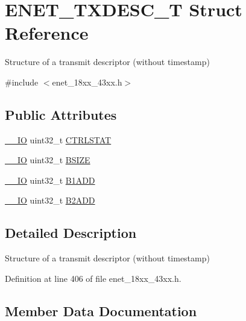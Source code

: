 \hypertarget{struct_e_n_e_t___t_x_d_e_s_c___t}{}\section{E\+N\+E\+T\+\_\+\+T\+X\+D\+E\+S\+C\+\_\+T Struct Reference}
\label{struct_e_n_e_t___t_x_d_e_s_c___t}


Structure of a transmit descriptor (without timestamp)  




{\ttfamily \#include $<$enet\+\_\+18xx\+\_\+43xx.\+h$>$}

\subsection*{Public Attributes}
\begin{DoxyCompactItemize}
\item 
\hyperlink{core__sc300_8h_aec43007d9998a0a0e01faede4133d6be}{\+\_\+\+\_\+\+IO} uint32\+\_\+t \hyperlink{struct_e_n_e_t___t_x_d_e_s_c___t_a858cf033e4c2808e17f597c58ac91301}{C\+T\+R\+L\+S\+T\+AT}
\item 
\hyperlink{core__sc300_8h_aec43007d9998a0a0e01faede4133d6be}{\+\_\+\+\_\+\+IO} uint32\+\_\+t \hyperlink{struct_e_n_e_t___t_x_d_e_s_c___t_a0fec133de05d4e90f21e4a050adce830}{B\+S\+I\+ZE}
\item 
\hyperlink{core__sc300_8h_aec43007d9998a0a0e01faede4133d6be}{\+\_\+\+\_\+\+IO} uint32\+\_\+t \hyperlink{struct_e_n_e_t___t_x_d_e_s_c___t_a9adbff74afe51f6f0a943e765cb01bf7}{B1\+A\+DD}
\item 
\hyperlink{core__sc300_8h_aec43007d9998a0a0e01faede4133d6be}{\+\_\+\+\_\+\+IO} uint32\+\_\+t \hyperlink{struct_e_n_e_t___t_x_d_e_s_c___t_afaa93705f68c83e15487ef32368e72e7}{B2\+A\+DD}
\end{DoxyCompactItemize}


\subsection{Detailed Description}
Structure of a transmit descriptor (without timestamp) 

Definition at line 406 of file enet\+\_\+18xx\+\_\+43xx.\+h.



\subsection{Member Data Documentation}
\mbox{\label{struct_e_n_e_t___t_x_d_e_s_c___t_a9adbff74afe51f6f0a943e765cb01bf7}} 

